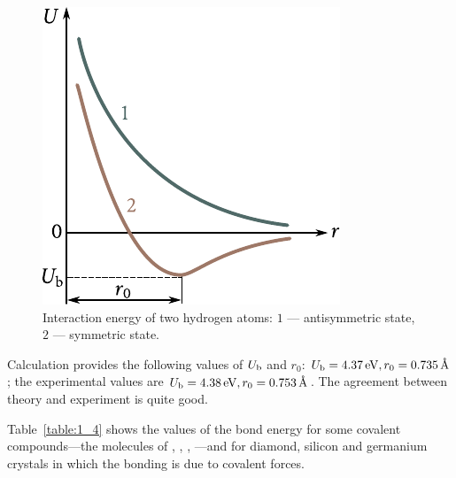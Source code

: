 \begin{figure}[t]
	\begin{center}
		\includegraphics[scale=1]{figures/ch_01/fig_1_7.pdf}
		\caption[]{Interaction energy of two hydrogen atoms: $1$ --- antisymmetric state, $2$ --- symmetric state.}
		\label{fig:1_7}
	\end{center}
	\vspace{-0.7cm}
\end{figure}

Calculation provides the following values of $U_{\text{b}}$ and $r_0$: $U_{\text{b}}=\SI{4.37}{\electronvolt}, r_0=\SI{0.735}{\angstrom}$; the experimental values are $U_{\text{b}}=\SI{4.38}{\electronvolt}, r_0=\SI{0.753}{\angstrom}$. The agreement between theory and experiment
is quite good.

Table~\ref{table:1_4} shows the values of the bond energy for some covalent compounds---the molecules of , , , ---and for diamond, silicon and germanium crystals in which the bonding is due to covalent forces.

\begin{table}[!b]
	\renewcommand{\arraystretch}{1.2}
	\caption{}
	\vspace{-0.6cm}
	\label{table:1_4}
	\begin{center}\end{center}
\end{table}

